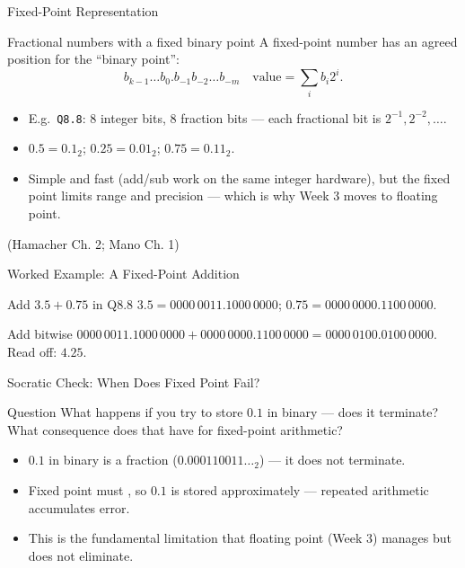 \documentclass[aspectratio=169]{beamer}
\begin{document}
\begin{frame}{Fixed-Point Representation}
  \begin{block}{Fractional numbers with a fixed binary point}
    A fixed-point number has an agreed position for the ``binary point'':
    \[
      b_{k-1}\dots b_0 . b_{-1} b_{-2} \dots b_{-m}
      \quad\text{value} = \sum_i b_i 2^i.
    \]
  \end{block}
  \begin{itemize}
    \item E.g.\ \texttt{Q8.8}: 8 integer bits, 8 fraction bits --- each
      fractional bit is $2^{-1}, 2^{-2}, \dots$.
    \item $0.5 = 0.1_2$; $0.25 = 0.01_2$; $0.75 = 0.11_2$.
    \item Simple and fast (add/sub work on the same integer hardware), but the
      fixed point limits range and precision --- which is why Week 3 moves to
      floating point.
  \end{itemize}
  (Hamacher Ch. 2; Mano Ch. 1) \cite{Hamacher2002_computer_organization,Mano1993_computer_system_architecture}
\end{frame}

\begin{frame}{Worked Example: A Fixed-Point Addition}
  \begin{block}{Add $3.5 + 0.75$ in Q8.8}
    $3.5 = 0000\,0011.1000\,0000$; $0.75 = 0000\,0000.1100\,0000$.
  \end{block}
  \begin{exampleblock}{Add bitwise}
    $0000\,0011.1000\,0000 + 0000\,0000.1100\,0000 = 0000\,0100.0100\,0000$.
    Read off: $4.25$. 
  \end{exampleblock}
  \vspace{0.2cm}
\end{frame}

\begin{frame}{Socratic Check: When Does Fixed Point Fail?}
  \begin{alertblock}{Question}
    What happens if you try to store $0.1$ in binary --- does it terminate?
    What consequence does that have for fixed-point arithmetic?
  \end{alertblock}
  \begin{itemize}
    \item $0.1$ in binary is a  fraction
      ($0.000110011\dots_2$) --- it does not terminate.
    \item Fixed point must , so $0.1$ is stored
      approximately --- repeated arithmetic accumulates error.
    \item This is the fundamental limitation that floating point (Week 3)
      manages but does not eliminate.
  \end{itemize}
\end{frame}
\end{document}
